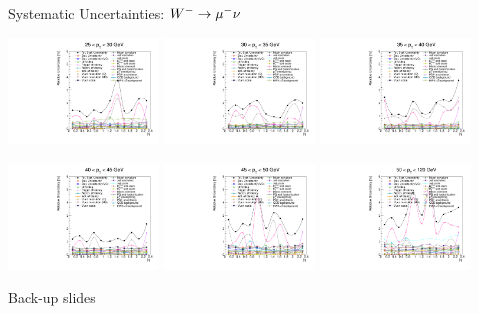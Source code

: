 \begin{frame}{Systematic Uncertainties: $W^- \rightarrow \mu^- \nu$}
 \begin{center}
   \includegraphics[width=0.3\textwidth]{dates/20121219/figures/xsec/NEG/Wmn_Unc_2d_Slice_2.pdf}
   \includegraphics[width=0.3\textwidth]{dates/20121219/figures/xsec/NEG/Wmn_Unc_2d_Slice_3.pdf}
   \includegraphics[width=0.3\textwidth]{dates/20121219/figures/xsec/NEG/Wmn_Unc_2d_Slice_4.pdf}
 \end{center}
 \begin{center}
   \includegraphics[width=0.3\textwidth]{dates/20121219/figures/xsec/NEG/Wmn_Unc_2d_Slice_5.pdf}
   \includegraphics[width=0.3\textwidth]{dates/20121219/figures/xsec/NEG/Wmn_Unc_2d_Slice_6.pdf}
   \includegraphics[width=0.3\textwidth]{dates/20121219/figures/xsec/NEG/Wmn_Unc_2d_Slice_7.pdf}
 \end{center}
\end{frame}


\appendix
{}
\setcounter{finalframe}{\value{framenumber}}

\slide{}
{

\centering
\Huge Back-up slides
}

